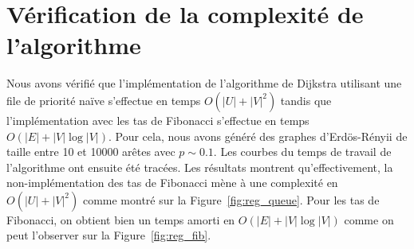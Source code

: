 \documentclass{article}
\begin{document}
\section{Vérification de la complexité de l'algorithme}
Nous avons vérifié que l'implémentation de l'algorithme de Dijkstra
utilisant une file de priorité naïve s'effectue en temps $O(|U| + |V|^2)$ tandis
que l'implémentation avec les tas de Fibonacci s'effectue en temps
$O(|E| + |V|\log |V|)$. Pour cela, nous avons généré des graphes
d'Erdös-Rényii de taille entre 10 et 10000 arêtes avec $p\sim
0.1$. Les courbes du temps de travail de l'algorithme ont ensuite été
tracées. Les résultats montrent qu'effectivement, la
non-implémentation des tas de Fibonacci mène à une complexité en
$O(|U| + |V|^2)$ comme montré sur la Figure~\ref{fig:reg_queue}. Pour
les tas de Fibonacci, on obtient bien un temps amorti en $O(|E| +
|V|\log |V|)$ comme on peut l'observer sur la Figure~\ref{fig:reg_fib}.
\end{document}
